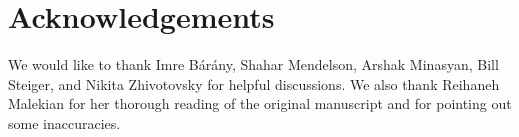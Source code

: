\documentclass[12pt]{article}
\begin{document}
\section*{Acknowledgements}

We would like to thank Imre B\'ar\'any, Shahar Mendelson, Arshak Minasyan, Bill Steiger, and Nikita Zhivotovsky for helpful discussions.
We also thank Reihaneh Malekian for her thorough reading of the original manuscript
and for pointing out some inaccuracies.





\end{document}
